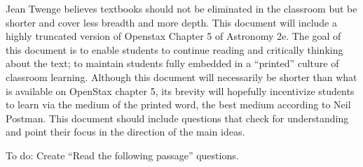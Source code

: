 \documentclass{article}
\begin{document}
Jean Twenge believes textbooks should not be eliminated in the classroom but be shorter and cover less breadth and more depth. This document will include a highly truncated version of Openstax Chapter 5 of Astronomy 2e. The goal of this document is to enable students to continue reading and critically thinking about the text; to maintain students fully embedded in a ``printed'' culture of classroom learning. Although this document will necessarily be shorter than what is available on OpenStax chapter 5, its brevity will hopefully incentivize students to learn via the medium of the printed word, the best medium according to Neil Postman. This document should include questions that check for understanding and point their focus in the direction of the main ideas.

To do: Create ``Read the following passage'' questions.
\end{document}
